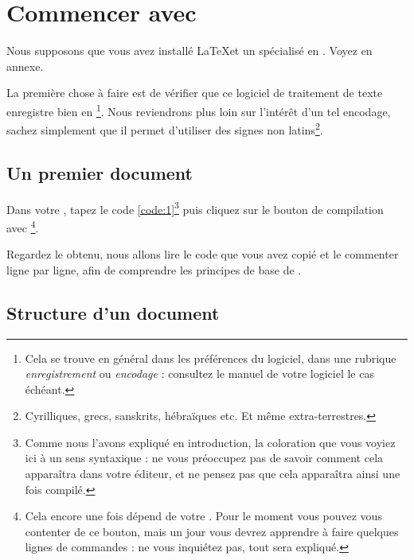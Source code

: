 \chapter{Commencer avec }

\begin{prealable}
Nous supposons que vous avez installé \LaTeX et un  spécialisé en \logiciel{\LaTeX}. Voyez en annexe.

La première chose à faire est de vérifier que ce logiciel de traitement de texte enregistre bien en \footnote{Cela se trouve en général dans les préférences du logiciel, dans une rubrique \emph{enregistrement} ou \emph{encodage} : consultez le manuel de votre logiciel le cas échéant.}. Nous reviendrons plus loin sur l'intérêt d'un tel encodage, sachez simplement que il permet d'utiliser des signes non latins\footnote{Cyrilliques, grecs, sanskrits, hébraïques etc. Et même extra-terrestres.}.

\end{prealable}

\section{Un premier document}

Dans votre , tapez le code \ref{code:1}\footnote{Comme nous l'avons expliqué en introduction, la coloration que vous voyiez ici à un sens syntaxique : ne vous préoccupez pas de savoir comment cela apparaîtra dans votre éditeur, et ne pensez pas que cela apparaîtra ainsi une fois compilé.} puis cliquez sur le bouton de compilation avec \footnote{Cela encore une fois dépend de votre . Pour le moment vous pouvez vous contenter de ce bouton, mais un jour vous devrez apprendre à faire quelques lignes de commandes : ne vous inquiétez pas, tout sera expliqué.}.


Regardez le  obtenu, nous allons lire le code que vous avez copié et le commenter ligne par ligne, afin de comprendre les principes de base de \logiciel{\LaTeX}.
\FloatBarrier

\section{Structure d'un document \logiciel{\LaTeX}}

